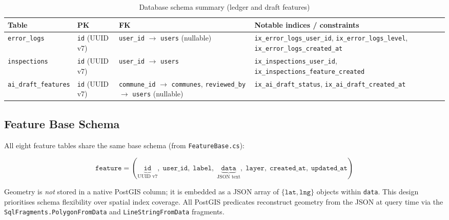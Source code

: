 \documentclass[12pt,a4paper]{article}
\theoremstyle{definition}
\theoremstyle{plain}
\theoremstyle{remark}
\begin{document}
\begin{table}[H]
\centering
\caption{Database schema summary (ledger and draft features)}
\begin{tabularx}{\textwidth}{ll>{\raggedright\arraybackslash}X>{\raggedright\arraybackslash}X}
\toprule
\textbf{Table} & \textbf{PK} & \textbf{FK} & \textbf{Notable indices / constraints} \\
\midrule
\texttt{error\_\allowbreak{}logs}
  & \texttt{id} (UUID v7)
  & \texttt{user\_\allowbreak{}id} $\to$ \texttt{users} (nullable)
  & \texttt{ix\_\allowbreak{}error\_\allowbreak{}logs\_\allowbreak{}user\_\allowbreak{}id}, \texttt{ix\_\allowbreak{}error\_\allowbreak{}logs\_\allowbreak{}level}, \texttt{ix\_\allowbreak{}error\_\allowbreak{}logs\_\allowbreak{}created\_\allowbreak{}at} \\
\texttt{inspections}
  & \texttt{id} (UUID v7)
  & \texttt{user\_\allowbreak{}id} $\to$ \texttt{users}
  & \texttt{ix\_\allowbreak{}inspections\_\allowbreak{}user\_\allowbreak{}id}, \texttt{ix\_\allowbreak{}inspections\_\allowbreak{}feature\_\allowbreak{}created} \\
\texttt{ai\_\allowbreak{}draft\_\allowbreak{}features}
  & \texttt{id} (UUID v7)
  & \texttt{commune\_\allowbreak{}id} $\to$ \texttt{communes}, \texttt{reviewed\_\allowbreak{}by} $\to$ \texttt{users} (nullable)
  & \texttt{ix\_\allowbreak{}ai\_\allowbreak{}draft\_\allowbreak{}status}, \texttt{ix\_\allowbreak{}ai\_\allowbreak{}draft\_\allowbreak{}created\_\allowbreak{}at} \\
\bottomrule
\end{tabularx}
\end{table}

\subsection{Feature Base Schema}

All eight feature tables share the same base schema
(from \texttt{FeatureBase.cs}):

\begin{equation}
  \texttt{feature} = (\underbrace{\texttt{id}}_{\text{UUID v7}},\;
  \texttt{user\_id},\; \texttt{label},\;
  \underbrace{\texttt{data}}_{\text{JSON text}},\;
  \texttt{layer},\; \texttt{created\_at},\; \texttt{updated\_at})
  \label{eq:feature_base}
\end{equation}

Geometry is \emph{not} stored in a native PostGIS column; it is embedded as
a JSON array of $\{\texttt{lat}, \texttt{lng}\}$ objects within \texttt{data}.
This design prioritises schema flexibility over spatial index coverage.
All PostGIS predicates reconstruct geometry from the JSON at query time via the
\texttt{SqlFragments.PolygonFromData} and \texttt{LineStringFromData} fragments.
\end{document}
